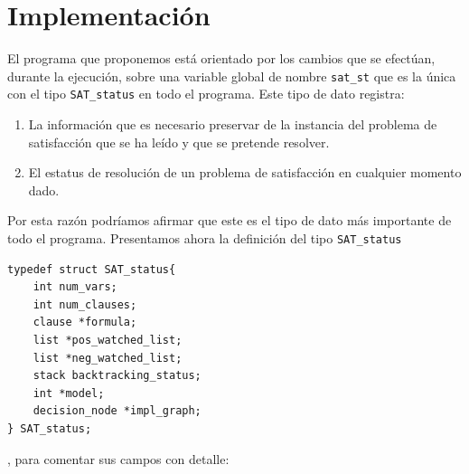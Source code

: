 \documentclass[12pt,lettersize,oneside]{article}
\begin{document}
\section{Implementación}

El programa que proponemos está orientado por los cambios que se efectúan,
durante la ejecución, sobre una variable global de nombre {\tt sat\_st} que es la
única con el tipo {\tt SAT\_status} en todo el programa. 
Este tipo de dato registra: \vspace{-4.5mm}
\begin{enumerate}
\item La información que es necesario preservar de la instancia del problema de
  satisfacción que se ha leído y que se pretende resolver.
\item El estatus de resolución de un problema de satisfacción en cualquier
  momento dado.
\end{enumerate}
Por esta razón podríamos afirmar que este es el tipo de dato más importante de
todo el programa.
Presentamos ahora la definición del tipo {\tt SAT\_status}
\begin{lstlisting}
typedef struct SAT_status{    
    int num_vars;
    int num_clauses;
    clause *formula;
    list *pos_watched_list;
    list *neg_watched_list;
    stack backtracking_status;
    int *model;
    decision_node *impl_graph;                     
} SAT_status;
\end{lstlisting}
, para comentar sus campos con detalle:\vspace{-2.5mm}
\end{document}
